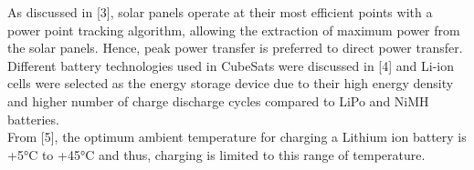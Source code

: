 As discussed in [3], solar panels operate at their most efficient points with a power point tracking algorithm, allowing the extraction of maximum power from the solar panels. Hence, peak power transfer is preferred to direct power transfer.
\\

Different battery technologies used in CubeSats were discussed in [4] and Li-ion cells were selected as the energy storage device due to their high energy density and higher number of charge discharge cycles compared to LiPo and NiMH batteries.
\\

From [5], the optimum ambient temperature for charging a Lithium ion battery is +5°C to +45°C and thus, charging is limited to this range of temperature.